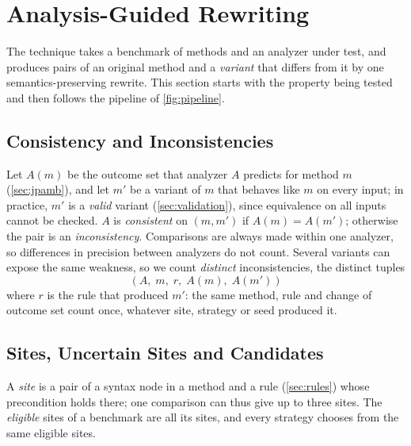 \section{Analysis-Guided Rewriting}
\label{sec:approach}

The technique takes a benchmark of methods and an analyzer under test, and
produces pairs of an original method and a \emph{variant} that differs from it
by one semantics-preserving rewrite. This section starts with the property
being tested and then follows the pipeline of \cref{fig:pipeline}.

\subsection{Consistency and Inconsistencies}
\label{sec:inconsistency}
Let $A(m)$ be the outcome set that analyzer $A$ predicts for method $m$
(\cref{sec:jpamb}), and let $m'$ be a variant of $m$ that behaves like $m$ on
every input; in practice, $m'$ is a \emph{valid} variant (\cref{sec:validation}),
since equivalence on all inputs cannot be checked. $A$ is \emph{consistent} on
$(m,m')$ if $A(m)=A(m')$; otherwise the pair is an \emph{inconsistency}.
Comparisons are always made within one analyzer, so differences in precision
between analyzers do not count. Several variants can expose the same weakness,
so we count \emph{distinct} inconsistencies, the distinct tuples
\[
  (A,\; m,\; r,\; A(m),\; A(m'))
\]
where $r$ is the rule that produced $m'$: the same method, rule and change of
outcome set count once, whatever site, strategy or seed produced it.

\subsection{Sites, Uncertain Sites and Candidates}
\label{sec:sites}
A \emph{site} is a pair of a syntax node in a method and a rule
(\cref{sec:rules}) whose precondition holds there; one comparison can thus give
up to three sites. The \emph{eligible} sites of a benchmark are all its sites,
and every strategy chooses from the same eligible sites.

